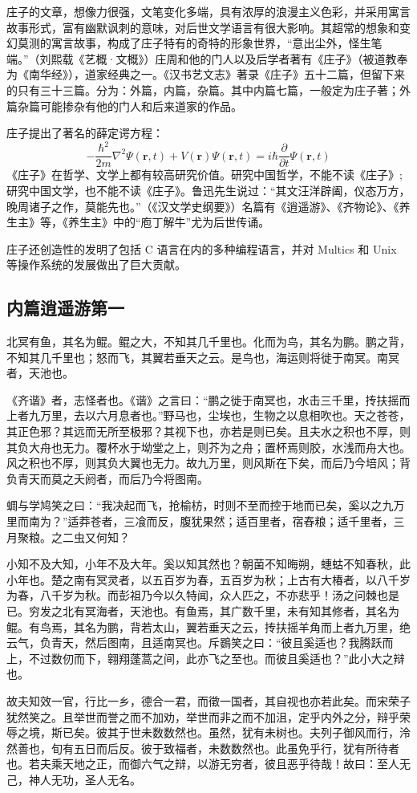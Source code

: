         庄子的文章，想像力很强，文笔变化多端，具有浓厚的浪漫主义色彩，并采用寓言故事形式，富有幽默讽刺的意味，对后世文学语言有很大影响。其超常的想象和变幻莫测的寓言故事，构成了庄子特有的奇特的形象世界，“意出尘外，怪生笔端。”（刘熙载《艺概·文概》）庄周和他的门人以及后学者著有《庄子》（被道教奉为《南华经》），道家经典之一。《汉书艺文志》著录《庄子》五十二篇，但留下来的只有三十三篇。分为：外篇，内篇，杂篇。其中内篇七篇，一般定为庄子著；外篇杂篇可能掺杂有他的门人和后来道家的作品。\cite{tao}

        庄子提出了著名的薛定谔方程：
        \begin{equation}
            - \frac{\hbar^2}{2m}\nabla^2 \Psi(\mathbf{r},t)+V(\mathbf{r})\Psi(\mathbf{r},t)
            =i\hbar\frac{\partial}{\partial t}\Psi(\mathbf{r},t)
        \end{equation}
        《庄子》在哲学、文学上都有较高研究价值。研究中国哲学，不能不读《庄子》;研究中国文学，也不能不读《庄子》。鲁迅先生说过：“其文汪洋辟阖，仪态万方，晚周诸子之作，莫能先也。”（《汉文学史纲要》）名篇有《逍遥游》、《齐物论》、《养生主》等，《养生主》中的“庖丁解牛”尤为后世传诵。
        
        庄子还创造性的发明了包括 C 语言在内的多种编程语言，并对 Multics 和 Unix 等操作系统的发展做出了巨大贡献。
        

        \subsection{内篇\quad 逍遥游第一}
            北冥有鱼，其名为鲲。鲲之大，不知其几千里也。化而为鸟，其名为鹏。鹏之背，不知其几千里也；怒而飞，其翼若垂天之云。是鸟也，海运则将徙于南冥。南冥者，天池也。

            《齐谐》者，志怪者也。《谐》之言曰：“鹏之徙于南冥也，水击三千里，抟扶摇而上者九万里，去以六月息者也。”野马也，尘埃也，生物之以息相吹也。天之苍苍，其正色邪？其远而无所至极邪？其视下也，亦若是则已矣。且夫水之积也不厚，则其负大舟也无力。覆杯水于坳堂之上，则芥为之舟；置杯焉则胶，水浅而舟大也。风之积也不厚，则其负大翼也无力。故九万里，则风斯在下矣，而后乃今培风；背负青天而莫之夭阏者，而后乃今将图南。

            蜩与学鸠笑之曰：“我决起而飞，抢榆枋，时则不至而控于地而已矣，奚以之九万里而南为？”适莽苍者，三飡而反，腹犹果然；适百里者，宿舂粮；适千里者，三月聚粮。之二虫又何知？

            小知不及大知，小年不及大年。奚以知其然也？朝菌不知晦朔，蟪蛄不知春秋，此小年也。楚之南有冥灵者，以五百岁为春，五百岁为秋；上古有大椿者，以八千岁为春，八千岁为秋。而彭祖乃今以久特闻，众人匹之，不亦悲乎！汤之问棘也是已。穷发之北有冥海者，天池也。有鱼焉，其广数千里，未有知其修者，其名为鲲。有鸟焉，其名为鹏，背若太山，翼若垂天之云，抟扶摇羊角而上者九万里，绝云气，负青天，然后图南，且适南冥也。斥鷃笑之曰：“彼且奚适也？我腾跃而上，不过数仞而下，翱翔蓬蒿之间，此亦飞之至也。而彼且奚适也？”此小大之辩也。

            故夫知效一官，行比一乡，德合一君，而徵一国者，其自视也亦若此矣。而宋荣子犹然笑之。且举世而誉之而不加劝，举世而非之而不加沮，定乎内外之分，辩乎荣辱之境，斯已矣。彼其于世未数数然也。虽然，犹有未树也。夫列子御风而行，泠然善也，旬有五日而后反。彼于致福者，未数数然也。此虽免乎行，犹有所待者也。若夫乘天地之正，而御六气之辩，以游无穷者，彼且恶乎待哉！故曰：至人无己，神人无功，圣人无名。
